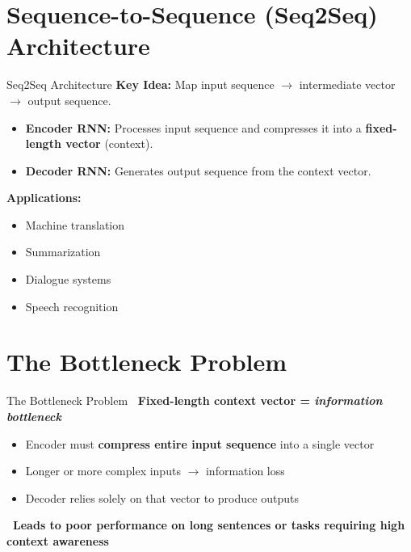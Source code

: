 \section{Sequence-to-Sequence (Seq2Seq) Architecture}
\begin{frame}{Seq2Seq Architecture}
    \textbf{Key Idea:} Map input sequence $\rightarrow$ intermediate vector $\rightarrow$ output sequence.
    \vspace{1em}
    \begin{itemize}
        \item \textbf{Encoder RNN:} Processes input sequence and compresses it into a \textbf{fixed-length vector} (context).
        \item \textbf{Decoder RNN:} Generates output sequence from the context vector.
    \end{itemize}
    \vspace{1em}
    \textbf{Applications:}
    \begin{itemize}
        \item Machine translation
        \item Summarization
        \item Dialogue systems
        \item Speech recognition
    \end{itemize}
\end{frame}


\section{The Bottleneck Problem}
\begin{frame}{The Bottleneck Problem}
    \textbf{\faArrowDown\ Fixed-length context vector = \emph{information bottleneck}}
    \begin{itemize}
        \item Encoder must \textbf{compress entire input sequence} into a single vector
        \item Longer or more complex inputs $\rightarrow$ information loss
        \item Decoder relies solely on that vector to produce outputs
    \end{itemize}
    \vspace{1em}
    \textbf{\faFlask\ Leads to poor performance on long sentences or tasks requiring high context awareness}
\end{frame}


